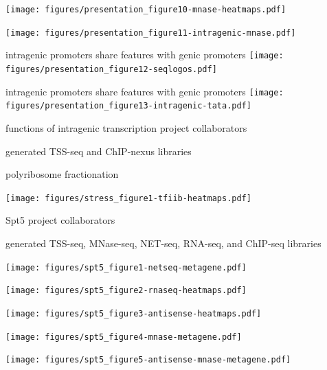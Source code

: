 \documentclass[aspectratio=169]{beamer}
\begin{document}
\begin{frame}
\texttt{[image: figures/presentation\_figure10-mnase-heatmaps.pdf]}
\end{frame}

\begin{frame}
\texttt{[image: figures/presentation\_figure11-intragenic-mnase.pdf]}
\end{frame}

\begin{frame}{intragenic promoters share features with genic promoters}
    \texttt{[image: figures/presentation\_figure12-seqlogos.pdf]}
\end{frame}

\begin{frame}{intragenic promoters share features with genic promoters}
    \texttt{[image: figures/presentation\_figure13-intragenic-tata.pdf]}
\end{frame}

\begin{frame}{functions of intragenic transcription project collaborators}
    \begin{description}[align=right, noitemsep]
        \item [Steve Doris] generated TSS-seq and ChIP-nexus libraries
        \item [Dan Spatt] polyribosome fractionation
    \end{description}
\end{frame}

\begin{frame}
\texttt{[image: figures/stress\_figure1-tfiib-heatmaps.pdf]}
\end{frame}

\begin{frame}{Spt5 project collaborators}
    \begin{description}[align=right, noitemsep]
        \item [Ameet Shetty] generated TSS-seq, MNase-seq, NET-seq, RNA-seq, and ChIP-seq libraries
    \end{description}
\end{frame}

\begin{frame}
\texttt{[image: figures/spt5\_figure1-netseq-metagene.pdf]}
\end{frame}

\begin{frame}
\texttt{[image: figures/spt5\_figure2-rnaseq-heatmaps.pdf]}
\end{frame}

\begin{frame}
\texttt{[image: figures/spt5\_figure3-antisense-heatmaps.pdf]}
\end{frame}

\begin{frame}
\texttt{[image: figures/spt5\_figure4-mnase-metagene.pdf]}
\end{frame}

\begin{frame}
\texttt{[image: figures/spt5\_figure5-antisense-mnase-metagene.pdf]}
\end{frame}
\end{document}
